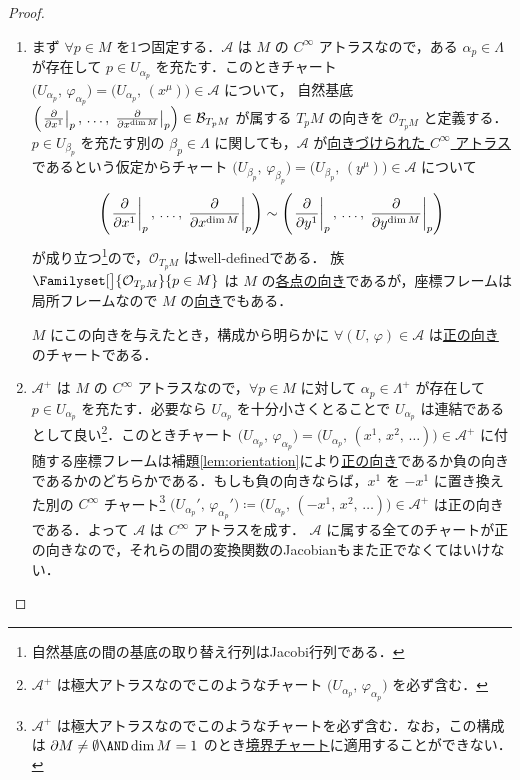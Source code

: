 \documentclass[geometry_main]{subfiles}
\begin{document}
\begin{proof}
	\begin{enumerate}
		\item まず $\forall p \in M$ を1つ固定する．$\mathcal{A}$ は $M$ の $C^\infty$ アトラスなので，ある $\alpha_p \in \Lambda$ が存在して $p \in U_{\alpha_p}$ を充たす．このときチャート $\bigl( U_{\alpha_p},\, \varphi_{\alpha_p} \bigr) = \bigl( U_{\alpha_p},\, (x^\mu) \bigr) \in \mathcal{A}$ について，
		自然基底 $\left( \eval{\pdv{}{x^1}}_{p},\, \dots,\, \eval{\pdv{}{x^{\dim M}}}_p \right) \in \mathcal{B}_{T_p M}$ が属する $T_p M$ の向きを $\mathcal{O}_{T_p M}$ と定義する．
		$p \in U_{\beta_p}$ を充たす別の $\beta_p \in \Lambda$ に関しても，$\mathcal{A}$ が\hyperref[def:atlas-oriented]{向きづけられた $C^\infty$ アトラス}であるという仮定からチャート $\bigl( U_{\beta_p},\, \varphi_{\beta_p} \bigr) = \bigl( U_{\beta_p},\, (y^\mu)\bigr) \in \mathcal{A}$ について 
		\begin{align}
			\left( \eval{\pdv{}{x^1}}_{p},\, \dots,\, \eval{\pdv{}{x^{\dim M}}}_p \right) \sim \left( \eval{\pdv{}{y^1}}_{p},\, \dots,\, \eval{\pdv{}{y^{\dim M}}}_p \right)
		\end{align}
		が成り立つ\footnote{自然基底の間の基底の取り替え行列はJacobi行列である．}ので，$\mathcal{O}_{T_p M}$ はwell-definedである．
		族 $\Familyset[\big]{\mathcal{O}_{T_p M}}{p \in M}$ は $M$ の\hyperref[def:smooth-orientation]{各点の向き}であるが，座標フレームは局所フレームなので $M$ の\hyperref[def:smooth-orientation]{向き}でもある．
		
		$M$ にこの向きを与えたとき，構成から明らかに $\forall (U,\, \varphi) \in \mathcal{A}$ は\hyperref[def:atlas-oriented]{正の向き}のチャートである．

		\item $\mathcal{A}^+$ は $M$ の $C^\infty$ アトラスなので，$\forall p \in M$ に対して $\alpha_p \in \Lambda^+$ が存在して $p \in U_{\alpha_p}$ を充たす．必要なら $U_{\alpha_p}$ を十分小さくとることで $U_{\alpha_p}$ は連結であるとして良い\footnote{$\mathcal{A}^+$ は極大アトラスなのでこのようなチャート $\bigl( U_{\alpha_p},\, \varphi_{\alpha_p} \bigr)$ を必ず含む．}．このときチャート $\bigl( U_{\alpha_p},\, \varphi_{\alpha_p} \bigr) = \bigl( U_{\alpha_p},\, (x^1,\, x^2,\, \dots) \bigr) \in \mathcal{A}^+$ に付随する座標フレームは補題\ref{lem:orientation}により\hyperref[def:smooth-orientation]{正の向き}であるか負の向きであるかのどちらかである．もしも負の向きならば，$x^1$ を $-x^1$ に置き換えた別の $C^\infty$ チャート\footnote{$\mathcal{A}^+$ は極大アトラスなのでこのようなチャートを必ず含む．なお，この構成は $\partial M \neq \emptyset \AND \dim M = 1$ のとき\hyperref[def:int-manifold-with-boundary]{境界チャート}に適用することができない．} $\bigl( U_{\alpha_p}',\, \varphi_{\alpha_p}' \bigr) \coloneqq  \bigl( U_{\alpha_p},\, (-x^1,\, x^2, \, \dots) \bigr) \in \mathcal{A}^+$ は正の向きである．よって $\mathcal{A}$ は $C^\infty$ アトラスを成す．
		$\mathcal{A}$ に属する全てのチャートが正の向きなので，それらの間の変換関数のJacobianもまた正でなくてはいけない．
	\end{enumerate}
	
\end{proof}
\end{document}
